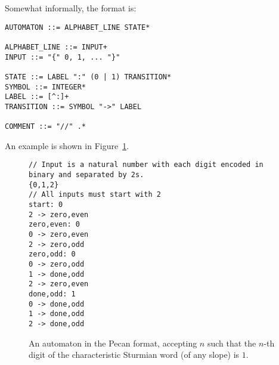 Somewhat informally, the format is:

\begin{lstlisting}[basicstyle=\normalsize\ttfamily]
AUTOMATON ::= ALPHABET_LINE STATE*

ALPHABET_LINE ::= INPUT+
INPUT ::= "{" 0, 1, ... "}"

STATE ::= LABEL ":" (0 | 1) TRANSITION*
SYMBOL ::= INTEGER*
LABEL ::= [^:]+
TRANSITION ::= SYMBOL "->" LABEL

COMMENT ::= "//" .*
\end{lstlisting}

An example is shown in Figure~\ref{fig:example-pecan-aut}.

\begin{figure}
    \centering
    \begin{lstlisting}[basicstyle=\normalsize\ttfamily]
// Input is a natural number with each digit encoded in binary and separated by 2s.
{0,1,2}
// All inputs must start with 2
start: 0
2 -> zero,even
zero,even: 0
0 -> zero,even
2 -> zero,odd
zero,odd: 0
0 -> zero,odd
1 -> done,odd
2 -> zero,even
done,odd: 1
0 -> done,odd
1 -> done,odd
2 -> done,odd
    \end{lstlisting}
    \caption{An automaton in the Pecan format, accepting $n$ such that the $n$-th digit of the characteristic Sturmian word (of any slope) is $1$.}
    \label{fig:example-pecan-aut}
\end{figure}
